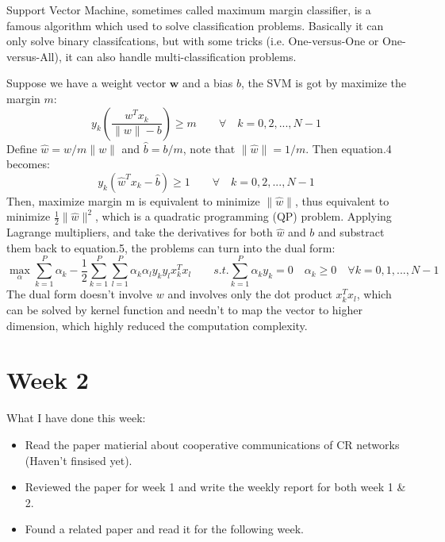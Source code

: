 \documentclass[journal]{IEEEtran}
\begin{document}
Support Vector Machine, sometimes called maximum margin classifier, is a famous algorithm which used to solve classification problems. Basically it can only solve binary classifcations, but with some tricks (i.e. One-versus-One or One-versus-All), it can also handle multi-classification problems.


Suppose we have a weight vector $\textbf{w}$ and a bias $b $, the SVM is got by maximize the margin $m$:
\begin{equation}
  y_k\left(\frac{w^Tx_k}{\|w\| - b} \right) \geqslant m \qquad \forall \quad k = 0,2,...,N-1
\end{equation}
Define $\hat{w} = w/m\|w\|$ and $\hat{b} = b/m$, note that $\|\hat{w}\| = 1/m $. Then equation.4 becomes:
\begin{equation}
  y_k\left(\hat{w}^Tx_k-\hat{b} \right) \geqslant 1 \qquad \forall \quad k = 0,2,...,N-1
\end{equation}
Then, maximize margin m is equivalent to minimize $\|\hat{w}\|$, thus equivalent to minimize $\frac{1}{2}\|\hat{w}\|^2$, which is a quadratic programming (QP) problem. Applying Lagrange multipliers, and take the derivatives for both $\hat{w}$ and $b$ and substract them back to equation.5, the problems can turn into the dual form:
\begin{equation}
  \max \limits_{\alpha} \sum_{k=1}^P \alpha_k - \frac{1}{2}\sum_{k=1}^P\sum_{l=1}^P\alpha_k\alpha_l y_k y_lx_k^T x_l \qquad s.t. \sum_{k=1}^P\alpha_ky_k = 0 \quad \alpha_k \geq 0 \quad \forall  k = 0,1,...,N-1
\end{equation}
The dual form doesn't involve $w$ and involves only the dot product $x_k^T x_l$, which can be solved by kernel function and needn't to map the vector to higher dimension, which highly reduced the computation complexity.
\section{Week 2}
What I have done this week:
\begin{itemize}
  \item Read the paper matierial about cooperative communications of CR networks \cite{liang2013cooperative} (Haven't finsised yet).
  \item Reviewed the paper for week 1 and write the weekly report for both week 1 \& 2.
  \item Found a related paper \cite{o2017introduction} and read it for the following week.
\end{itemize}
\end{document}
